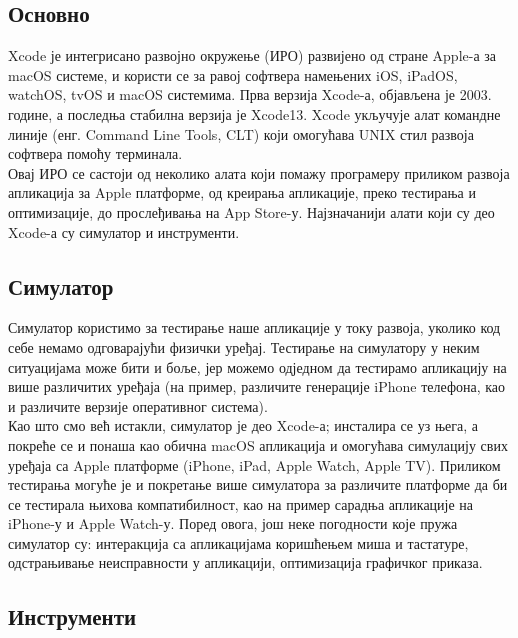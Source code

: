 \documentclass[12pt,oneside]{memoir}
\begin{document}
\subsection{Основно}

\indent Xcode је интегрисано развојно окружење (ИРО) развијено од стране Apple-а за macOS системе, и користи се за равој софтвера намењених iOS, iPadOS, watchOS, tvOS и macOS системима. Прва верзија Xcode-а, објављена је 2003. године, а последња стабилна верзија је Xcode13. Xcode укључује алат командне линије (енг. Command Line Tools, CLT) који омогућава UNIX стил развоја софтвера помоћу терминала. 
\\
\indent Овај ИРО се састоји од неколико алата који помажу програмеру приликом развоја апликација за Apple платформе, од креирања апликације, преко тестирања и оптимизације, до прослеђивања на App Store-у. Најзначанији алати који су део Xcode-а су симулатор и инструменти.

\subsection{Симулатор}
\indent Симулатор користимо за тестирање наше апликације у току развоја, уколико код себе немамо одговарајући физички уређај. Тестирање на симулатору у неким ситуацијама може бити и боље, јер можемо одједном да тестирамо апликацију на више различитих уређаја (на пример, различите генерације iPhone телефона, као и различите верзије оперативног система). 
\\
\indent Као што смо већ истакли, симулатор је део Xcode-а; инсталира се уз њега, а покреће се и понаша као обична macOS апликација и омогућава симулацију свих уређаја са Apple платформе (iPhone, iPad, Apple Watch, Apple TV). Приликом тестирања могуће је и покретање више симулатора за различите платформе да би се тестирала њихова компатибилност, као на пример сарадња апликације на iPhone-у и Apple Watch-у. 
Поред овога, још неке погодности које пружа симулатор су: интеракција са апликацијама коришћењем миша и тастатуре, одстрањивање неисправности у апликацији, оптимизација графичког приказа.


\subsection{Инструменти}
\end{document}
